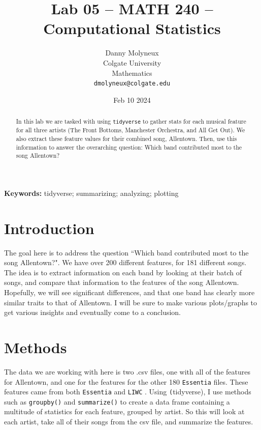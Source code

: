 \documentclass{article}\usepackage[]{graphicx}\usepackage[]{xcolor}
\begin{document}
\vspace{-1in}
\title{Lab 05 -- MATH 240 -- Computational Statistics}

\author{
  Danny Molyneux \\
  Colgate University  \\
  Mathematics  \\
  {\tt dmolyneux@colgate.edu}
}

\date{Feb 10 2024}

\maketitle


\begin{multicols}{2}
\begin{abstract}
In this lab we are tasked with using \texttt{tidyverse} \citep{tidy} to gather stats for each musical feature for all three artists (The Front Bottoms, Manchester Orchestra, and All Get Out). We also extract these feature values for their combined song, Allentown. Then, use this information to answer the overarching question: Which band contributed most to the song Allentown?
\end{abstract}

\noindent \textbf{Keywords:} tidyverse; summarizing; analyzing; plotting
\section{Introduction}
The goal here is to address the question ``Which band contributed most to the song Allentown?". We have over 200 different features, for 181 different songs. The idea is to extract information on each band by looking at their batch of songs, and compare that information to the features of the song Allentown. Hopefully, we will see significant differences, and that one band has clearly more similar traits to that of Allentown. I will be sure to make various plots/graphs to get various insights and eventually come to a conclusion.
\section{Methods}
The data we are working with here is two .csv files, one with all of the features for Allentown, and one for the features for the other 180 \texttt{Essentia} \citep{Essentia} files. These features came from both \texttt{Essentia} and \texttt{LIWC} \citep{liwc}. Using \texttt(tidyverse), I use methods such as \texttt{group\textunderscore by()} and \texttt{summarize()} to create a data frame containing a multitude of statistics for each feature, grouped by artist. So this will look at each artist, take all of their songs from the csv file, and summarize the features. 


\end{multicols}
\end{document}
